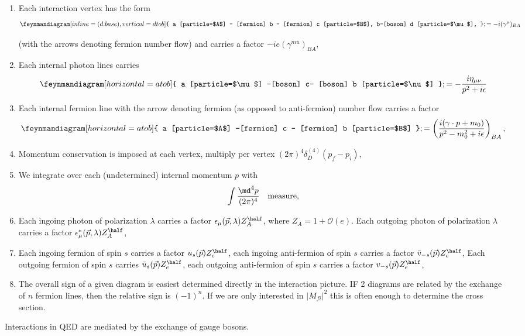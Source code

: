 	\begin{enumerate}
		\item Each interaction vertex has the form 
		\begin{equation}
		\feynmandiagram[inline=(d.base), vertical=d to b] {
		a [particle=$A$] -- [fermion] b -- [fermion] c [particle=$B$],
		b--[boson] d [particle=$\mu$],	
}; = -i (\gamma^{\mu})_{BA}
		\end{equation}

		 (with the arrows denoting fermion number flow) and carries a factor $-i e (\gamma^{mu})_{BA}$,
		 \item Each internal photon lines carries
		 \begin{equation}
		 	\feynmandiagram[ horizontal=a to b]{
		 	a [particle=$\mu$] --[boson] c-- [boson] b [particle=$\nu$]
	 	};
 	= -\frac{i \eta_{\mu \nu} }{p^2 + i \epsilon}
		 \end{equation}
		\item Each internal fermion line with the arrow denoting fermion (as opposed to anti-fermion) number flow carries a factor 
		\begin{equation}
			\feynmandiagram[horizontal=a to b]{
			a [particle=$A$] --[fermion] c -- [fermion] b [particle=$B$]
		};
	= \left(\frac{i(\gamma \cdot p + m_0)}{p^2-m^2_0 +i \epsilon }\right)_{BA},
		\end{equation}
		\item Momentum conservation is imposed at each vertex, multiply per vertex $(2 \pi)^4 \delta^{(4)}_D(p_f-p_i)$,
		\item We integrate over each (undetermined) internal momentum $p$ with
		\begin{equation}
			\int \frac{\md^4 p}{(2 \pi)^4} \quad \mathrm{measure},
		\end{equation}
		\item Each ingoing photon of polarization $\lambda$ carries a factor $\epsilon_{\mu} (\vec{p},\lambda) Z^{\half}_A$, where $Z_A =1+\mathcal{O}(e)$. Each outgoing photon of polarization $\lambda$ carries a factor $\epsilon^*_{\mu} (\vec{p},\lambda) Z^{\half}_A$,
		\item Each ingoing fermion of spin $s$ carries a factor $u_s(\vec{p}) Z^{\half}_e$, each  ingoing anti-fermion of spin $s$ carries a factor $\bar{v}_{-s}(\vec{p})Z^{\half}_e$, Each outgoing fermion of spin $s$ carries $\bar{u}_s(\vec{p}) Z^{\half}_e$, each outgoing anti-fermion of spin $s$ carries a factor $v_{-s}(\vec{p})Z^{\half}_e$,
		\item The overall sign of a given diagram is easiest determined directly in the interaction picture. IF 2 diagrams are related by the exchange of $n$ fermion lines, then the relative sign is $(-1)^n$. If we are only interested in $|M_{fi}|^2$ this is often enough to determine the cross section.
	\end{enumerate}
Interactions in QED are mediated by the exchange of gauge bosons.










